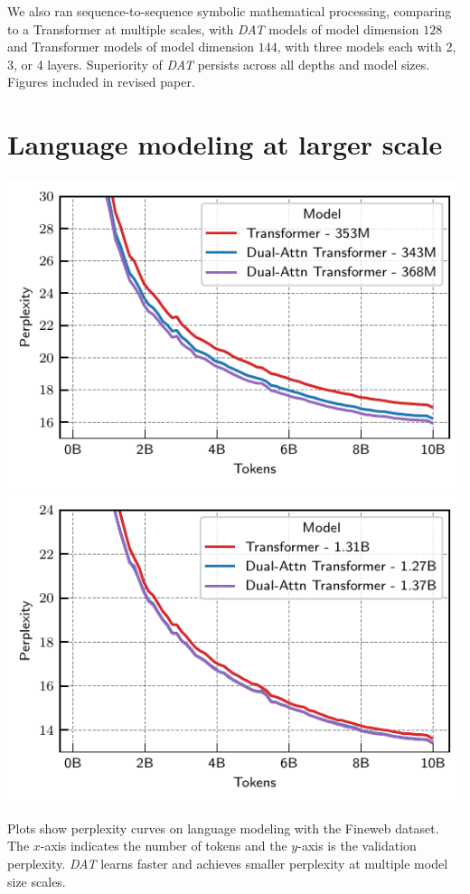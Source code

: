 \documentclass[a0,landscape,pdftex]{a0poster}
\begin{document}
\begin{minipage}{55cm}

%     

We also ran sequence-to-sequence symbolic mathematical processing, comparing to a Transformer at multiple scales, with \textit{DAT} models of model dimension $128$ and Transformer models of model dimension $144$, with three models each with 2, 3, or 4 layers. Superiority of \textit{DAT} persists across all depths and model sizes. Figures included in revised paper.


\section*{Language modeling at larger scale}

\includegraphics[width=.50\textwidth]{../figs/experiments/fineweb/350M_scale_lm.pdf}
\includegraphics[width=.50\textwidth]{../figs/experiments/fineweb/1_3B_scale_lm.pdf}

Plots show perplexity curves on language modeling with the Fineweb dataset. The $x$-axis indicates the number of tokens and the $y$-axis is the validation perplexity. \textit{DAT} learns faster and achieves smaller perplexity at multiple model size scales.

\vskip2cm
\begin{center}

\end{center}

\end{minipage}
\end{document}
